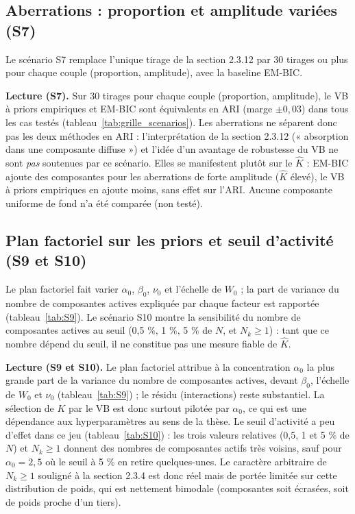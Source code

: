 \subsection{Aberrations : proportion et amplitude variées (S7)}
Le scénario S7 remplace l'unique tirage de la section 2.3.12 par 30 tirages ou plus pour chaque couple (proportion, amplitude), avec la baseline EM-BIC.


\textbf{Lecture (S7). }Sur 30 tirages pour chaque couple (proportion, amplitude), le VB à priors empiriques et EM-BIC sont équivalents en ARI (marge $\pm0{,}03$) dans tous les cas testés (tableau~\ref{tab:grille_scenarios}). Les aberrations ne séparent donc pas les deux méthodes en ARI : l'interprétation de la section 2.3.12 (« absorption dans une composante diffuse ») et l'idée d'un avantage de robustesse du VB ne sont \emph{pas} soutenues par ce scénario. Elles se manifestent plutôt sur le $\hat K$ : EM-BIC ajoute des composantes pour les aberrations de forte amplitude ($\hat K$ élevé), le VB à priors empiriques en ajoute moins, sans effet sur l'ARI. Aucune composante uniforme de fond n'a été comparée (non testé).


\subsection{Plan factoriel sur les priors et seuil d'activité (S9 et S10)}
Le plan factoriel fait varier $\alpha_0$, $\beta_0$, $\nu_0$ et l'échelle de $W_0$ ; la part de variance du nombre de composantes actives expliquée par chaque facteur est rapportée (tableau~\ref{tab:S9}). Le scénario S10 montre la sensibilité du nombre de composantes actives au seuil (0,5 \%, 1 \%, 5 \% de $N$, et $N_k \geq 1$) : tant que ce nombre dépend du seuil, il ne constitue pas une mesure fiable de $\hat K$.


\textbf{Lecture (S9 et S10). }Le plan factoriel attribue à la concentration $\alpha_0$ la plus grande part de la variance du nombre de composantes actives, devant $\beta_0$, l'échelle de $W_0$ et $\nu_0$ (tableau~\ref{tab:S9}) ; le résidu (interactions) reste substantiel. La sélection de $K$ par le VB est donc surtout pilotée par $\alpha_0$, ce qui est une dépendance aux hyperparamètres au sens de la thèse. Le seuil d'activité a peu d'effet dans ce jeu (tableau~\ref{tab:S10}) : les trois valeurs relatives (0,5, 1 et 5 \% de $N$) et $N_k \geq 1$ donnent des nombres de composantes actifs très voisins, sauf pour $\alpha_0 = 2{,}5$ où le seuil à 5 \% en retire quelques-unes. Le caractère arbitraire de $N_k \geq 1$ souligné à la section 2.3.4 est donc réel mais de portée limitée sur cette distribution de poids, qui est nettement bimodale (composantes soit écrasées, soit de poids proche d'un tiers).

